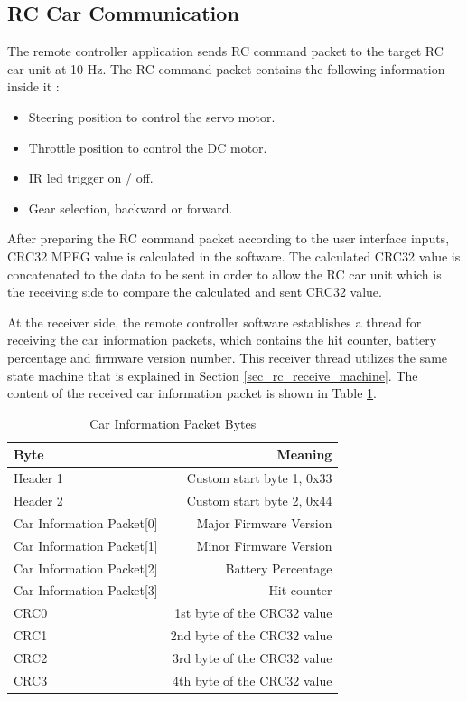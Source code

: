 \subsection{RC Car Communication} \label{sec_rc_comm}
The remote controller application sends RC command packet to the target RC car unit at 10 Hz. The RC command packet contains the following information inside it :

\begin{itemize}
    \item Steering position to control the servo motor.
    \item Throttle position to control the DC motor.
    \item IR led trigger on / off.
    \item Gear selection, backward or forward.
\end{itemize}

After preparing the RC command packet according to the user interface inputs, CRC32 MPEG value is calculated in the software. The calculated CRC32 value is concatenated to the data to be sent in order to allow the RC car unit which is the receiving side to compare the calculated and sent CRC32 value.

At the receiver side, the remote controller software establishes a thread for receiving the car information packets, which contains the hit counter, battery percentage and firmware version number. This receiver thread utilizes the same state machine that is explained in Section \ref{sec_rc_receive_machine}. The content of the received car information packet is shown in Table \ref{tab:carinfo_packet_content_table}.

\begin{table}[!htbp]
    \centering
    \caption{\label{tab:carinfo_packet_content_table}Car Information Packet Bytes}
    \begin{tabular}{l|r}
        Byte & Meaning \\\hline
        Header 1 & Custom start byte 1, 0x33 \\
        Header 2 & Custom start byte 2, 0x44 \\
        Car Information Packet[0] & Major Firmware Version \\
        Car Information Packet[1] & Minor Firmware Version \\
        Car Information Packet[2] & Battery Percentage \\
        Car Information Packet[3] & Hit counter \\
        CRC0 & 1st byte of the CRC32 value \\
        CRC1 & 2nd byte of the CRC32 value \\
        CRC2 & 3rd byte of the CRC32 value \\
        CRC3 & 4th byte of the CRC32 value \\
    \end{tabular}
\end{table}


